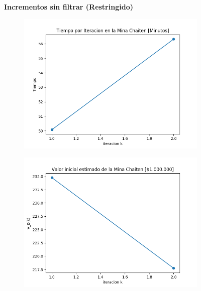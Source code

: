 \documentclass[12pt,letterpaper]{article}
\begin{document}
\begin{figure}
  \captionsetup[subfigure]{labelformat=empty}
  \centering
  \textbf{Incrementos sin filtrar (Restringido)}
  
  \begin{subfigure}[b]{0.4\textwidth}
     \includegraphics[width=\textwidth]{Graficos/sin_filtrar/restringido/chaiten_inc_times.png}
     \caption{}
     \label{fig:ex1}
  \end{subfigure}
  \begin{subfigure}[b]{0.4\textwidth}
     \includegraphics[width=\textwidth]{Graficos/sin_filtrar/restringido/chaiten_inc_v_k.png}
     \caption{}
     \label{fig:ex2}
  \end{subfigure}
\end{figure}
\end{document}
